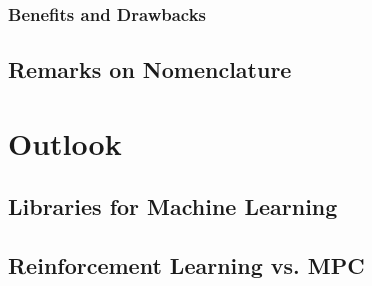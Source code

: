 		\subsection{Benefits and Drawbacks} %

	\section{Remarks on Nomenclature} %

\chapter{Outlook} %

	\section{Libraries for Machine Learning} %

	\section{Reinforcement Learning vs. MPC} %
